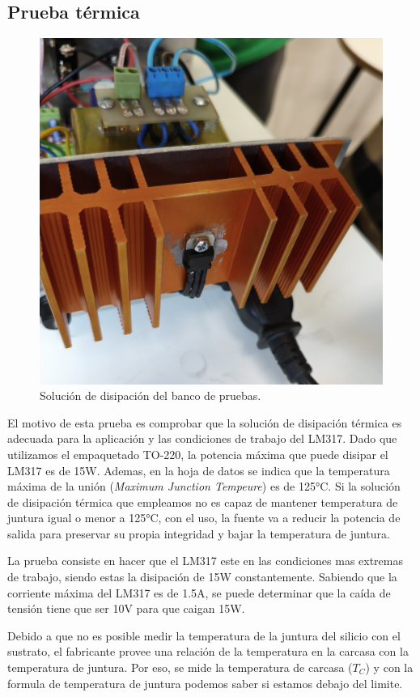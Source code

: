 \documentclass[chaptersright]{informeutn}
\begin{document}
      \subsection{Prueba térmica}
        \begin{figure}
          \centering
          \includegraphics[width=.4\textwidth]{pictures/reg_discipador.jpeg}
          \caption{Solución de disipación del banco de pruebas.}
        \end{figure}
        El motivo de esta prueba es comprobar que la solución de disipación térmica es adecuada para la aplicación y
        las condiciones de trabajo del LM317. Dado que utilizamos el empaquetado TO-220, la potencia máxima que puede
        disipar el LM317 es de 15W. Ademas, en la hoja de datos se indica que la temperatura máxima de la unión
        (\textit{Maximum Junction Tempeure}) es de 125°C. Si la solución de disipación térmica que empleamos no
        es capaz de mantener temperatura de juntura igual o menor a 125°C, con el uso, la fuente va a reducir la
        potencia de salida para preservar su propia integridad y bajar la temperatura de juntura.

        La prueba consiste en hacer que el LM317 este en las condiciones mas extremas de trabajo, siendo estas la
        disipación de 15W constantemente. Sabiendo que la corriente máxima del LM317 es de 1.5A, se puede determinar
        que la caída de tensión tiene que ser 10V para que caigan 15W.

        Debido a que no es posible medir la temperatura de la juntura del silicio con el sustrato, el fabricante
        provee una relación de la temperatura en la carcasa con la temperatura de juntura. Por eso, se mide la
        temperatura de carcasa ($T_C$) y con la formula de temperatura de juntura podemos saber si estamos
        debajo del limite.
\end{document}
